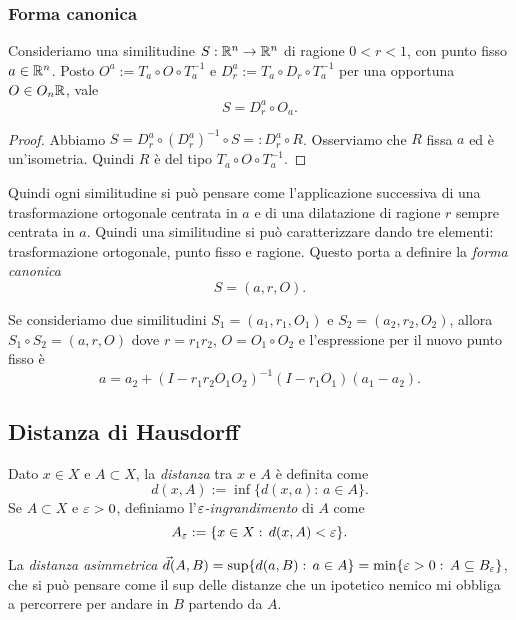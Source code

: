 \subsubsection{Forma canonica}

\begin{proposizione}
	Consideriamo una similitudine $S:\mathbb{R}^{n}\to\mathbb{R}^{n}$ di ragione $0<r<1$, con punto fisso $a\in\mathbb{R}^{n}$. Posto $O^{a}:=T_{a}\circ O\circ T_{a}^{-1}$ e $D_{r}^{a}:= T_{a}\circ D_{r}\circ T_{a}^{-1}$ per una opportuna $O\in O_{n}\mathbb{R}$, vale
	$$S = D_{r}^{a}\circ O_{a}.$$ 
\end{proposizione}
\begin{proof}
	Abbiamo $S = D_{r}^{a}\circ (D_{r}^{a})^{-1}\circ S =: D_{r}^{a}\circ R$. Osserviamo che $R$ fissa $a$ ed è un'isometria. Quindi $R$ è del tipo $T_{a}\circ O \circ T_{a}^{-1}$.
\end{proof}

	Quindi ogni similitudine si può pensare come l'applicazione successiva di una trasformazione ortogonale centrata in $a$ e di una dilatazione di ragione $r$ sempre centrata in $a$. Quindi una similitudine si può caratterizzare dando tre elementi: trasformazione ortogonale, punto fisso e ragione. Questo porta a definire la \emph{forma canonica}
	$$S = (a,r,O).$$
	
\begin{osservazione}
	Se consideriamo due similitudini $S_{1} = (a_{1}, r_{1}, O_{1})$ e $S_{2} = (a_{2}, r_{2}, O_{2})$, allora $S_{1}\circ S_{2} = (a, r, O)$ dove $r = r_{1}r_{2}$, $O = O_{1}\circ O_{2}$ e l'espressione per il nuovo punto fisso è 
	$$a = a_{2} + (I-r_{1}r_{2}O_{1}O_{2})^{-1}(I-r_{1}O_{1})(a_{1}-a_{2}).$$
\end{osservazione}


\subsection{Distanza di Hausdorff}
	
	Dato $x\in X$ e $A\subset X$, la \emph{distanza} tra $x$ e $A$ è definita come 
	$$d(x,A) := \inf \{d(x,a):\, a\in A\}.$$
	Se $A\subset X$ e $\varepsilon>0$, definiamo l'\emph{$\varepsilon$-ingrandimento} di $A$ come 
	$$A_{\varepsilon} := \{x\in X:\, d(x,A)<\varepsilon\}.$$
	
\begin{definizione}
	La \emph{distanza asimmetrica} $\vec d (A,B) = \sup\{d(a,B):\,a\in A\} = \min\{\varepsilon>0:\, A\subseteq B_{\varepsilon}\}$, che si può pensare come il sup delle distanze che un ipotetico nemico mi obbliga a percorrere per andare in $B$ partendo da $A$. 
\end{definizione}
	

